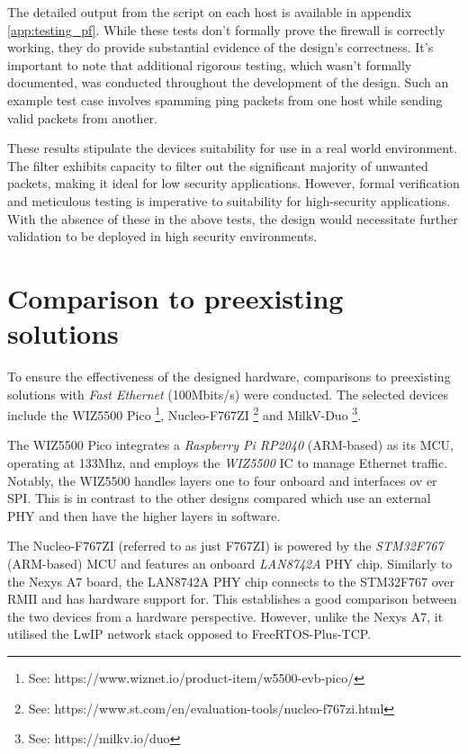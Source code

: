 The detailed output from the script on each host is available in appendix \ref{app:testing_pf}. While these tests don't formally prove the firewall is correctly working, they do provide substantial evidence of the design's correctness. It's important to note that additional rigorous testing, which wasn't formally documented, was conducted throughout the development of the design. Such an example test case involves spamming ping packets from one host while sending valid packets from another. 

These results stipulate the devices suitability for use in a real world environment. The filter exhibits capacity to filter out the significant majority of unwanted packets, making it ideal for low security applications. However, formal verification and meticulous testing is imperative to suitability for high-security applications. With the absence of these in the above tests, the design would necessitate further validation to be deployed in high security environments. 















\section{Comparison to preexisting solutions}

To ensure the effectiveness of the designed hardware, comparisons to preexisting solutions with \textit{Fast Ethernet} (100Mbits/s) were conducted. The selected devices include the WIZ5500 Pico \footnote[1]{See: https://www.wiznet.io/product-item/w5500-evb-pico/}, Nucleo-F767ZI \footnote[2]{See: https://www.st.com/en/evaluation-tools/nucleo-f767zi.html} and MilkV-Duo \footnote[3]{See: https://milkv.io/duo}.

The WIZ5500 Pico integrates a \textit{Raspberry Pi RP2040} (ARM-based) as its MCU, operating at 133Mhz, and employs the \textit{WIZ5500} IC to manage Ethernet traffic. Notably, the WIZ5500 handles layers one to four onboard and interfaces ov er SPI. This is in contrast to the other designs compared which use an external PHY and then have the higher layers in software. 

The Nucleo-F767ZI (referred to as just F767ZI) is powered by the \textit{STM32F767} (ARM-based) MCU and features an onboard \textit{LAN8742A} PHY chip. Similarly to the Nexys A7 board, the LAN8742A PHY chip connects to the STM32F767 over RMII and has hardware support for. This establishes a good comparison between the two devices from a hardware perspective. However, unlike the Nexys A7, it utilised the LwIP network stack opposed to FreeRTOS-Plus-TCP. 


